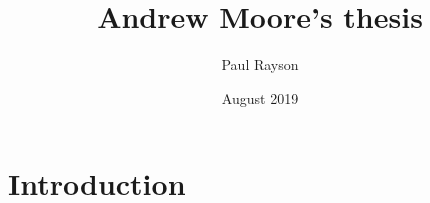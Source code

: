 \documentclass{article}
\title{Andrew Moore's thesis}
\author{Paul Rayson}
\date{August 2019}
\begin{document}
\maketitle

\section{Introduction}
\end{document}
